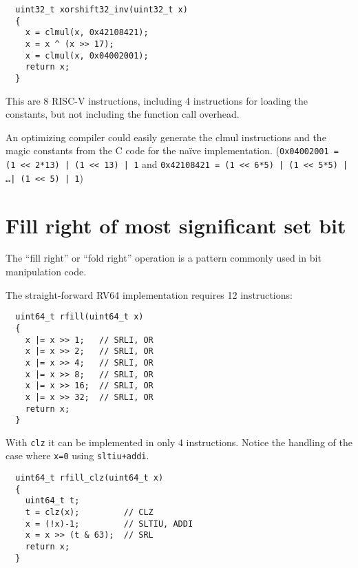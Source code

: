 \begin{minipage}{\linewidth}
\begin{verbatim}
  uint32_t xorshift32_inv(uint32_t x)
  {
    x = clmul(x, 0x42108421);
    x = x ^ (x >> 17);
    x = clmul(x, 0x04002001);
    return x;
  }
\end{verbatim}
\end{minipage}

This are 8 RISC-V instructions, including 4 instructions for loading the
constants, but not including the function call overhead.

An optimizing compiler could easily generate the clmul instructions and the magic
constants from the C code for the na\"ive implementation. ({\tt 0x04002001 = (1 << 2*13) | (1 << 13) | 1}
and {\tt 0x42108421 = (1 << 6*5) | (1 << 5*5) | \dots | (1 << 5) | 1})


\section{Fill right of most significant set bit}

The ``fill right'' or ``fold right'' operation is a pattern commonly used in bit manipulation code.~\cite{MAGIC}

The straight-forward RV64 implementation requires 12 instructions:

\begin{minipage}{\linewidth}
\begin{verbatim}
  uint64_t rfill(uint64_t x)
  {
    x |= x >> 1;   // SRLI, OR
    x |= x >> 2;   // SRLI, OR
    x |= x >> 4;   // SRLI, OR
    x |= x >> 8;   // SRLI, OR
    x |= x >> 16;  // SRLI, OR
    x |= x >> 32;  // SRLI, OR
    return x;
  }
\end{verbatim}
\end{minipage}

With {\tt clz} it can be implemented in only 4 instructions. Notice the
handling of the case where {\tt x=0} using {\tt sltiu+addi}.

\begin{minipage}{\linewidth}
\begin{verbatim}
  uint64_t rfill_clz(uint64_t x)
  {
    uint64_t t;
    t = clz(x);         // CLZ
    x = (!x)-1;         // SLTIU, ADDI
    x = x >> (t & 63);  // SRL
    return x;
  }
\end{verbatim}
\end{minipage}

